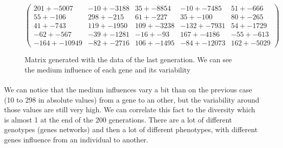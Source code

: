 \documentclass[]{report} %
\begin{document}
    \begin{figure}[H] 
            \centering
            \small
    $
            \begin{pmatrix}
                201 +- 5007 & -10 +- 3188 & 35 +- 8854 & -10 +- 7485 & 51 +- 666 \\
                55 +- 106 & 298 +- 215 & 61 +- 227 & 35 +- 100 & 80 +- 265 \\
                41 +- 743 & 119 +- 1950 & 109 +- 3238 & -132 +- 7931 & 54 +- 1729 \\
                -62 +- 567 & -39 +- 1281 & -16 +- 93 & 167 +- 4186 & -55 +- 613 \\
                -164 +- 10949 & -82 +- 2716 & 106 +- 1495 & -84 +- 12073 & 162 +- 5029  
            \end{pmatrix}
    $
            \caption{\footnotesize Matrix generated with the data of the last generation. We can see the medium influence of each gene and its variability}
            \label{mat:ps300xg200xmr1-10-2}
    \end{figure}    
    \paragraph*{}
    We can notice that the medium influences vary a bit than on the previous case (10 to 298 in absolute values) from a gene to an other, but the variability around those values are still very high. We can correlate this fact to the diversity which is almost 1 at the end of the 200 generations. There are a lot of different genotypes (genes networks) and then a lot of different phenotypes, with different genes influence from an individual to another.

      
\end{document}
